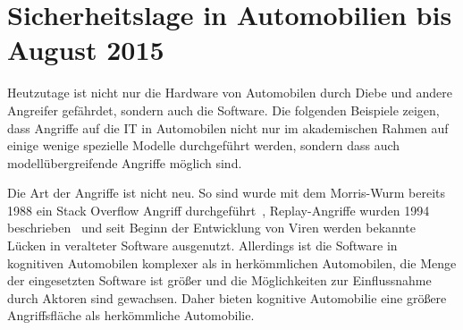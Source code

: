 \section{Sicherheitslage in Automobilien bis August 2015}
Heutzutage ist nicht nur die Hardware von Automobilen durch Diebe und andere
Angreifer gefährdet, sondern auch die Software. Die folgenden Beispiele zeigen,
dass Angriffe auf die IT in Automobilen nicht nur im akademischen Rahmen
auf einige wenige spezielle Modelle durchgeführt werden, sondern dass auch
modellübergreifende Angriffe möglich sind.

Die Art der Angriffe ist nicht neu. So sind wurde mit dem Morris-Wurm bereits
1988 ein Stack Overflow Angriff durchgeführt~\cite{Seltzer2013},
Replay-Angriffe wurden 1994 beschrieben~\cite{Syverson1994} und seit Beginn
der Entwicklung von Viren werden bekannte Lücken in veralteter Software
ausgenutzt. Allerdings ist die Software in kognitiven Automobilen komplexer
als in herkömmlichen Automobilen, die Menge der eingesetzten Software ist
größer und die Möglichkeiten zur Einflussnahme durch Aktoren sind gewachsen.
Daher bieten kognitive Automobilie eine größere Angriffsfläche als
herkömmliche Automobilie.

